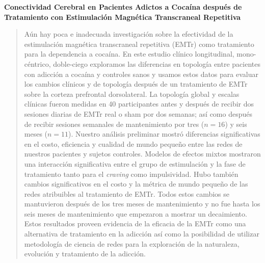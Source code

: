 \begin{center}
    \large\textbf{Conectividad Cerebral en Pacientes Adictos a Cocaína después de
     Tratamiento con Estimulación Magnética Transcraneal Repetitiva}
\end{center}
\begin{quotation}
    \noindent
    Aún hay poca e inadecuada investigación sobre la efectividad de la estimulación magnética transcraneal repetitiva (EMTr) como tratamiento para la dependencia a cocaína. En este estudio clínico longitudinal, mono-céntrico, doble-ciego exploramos las diferencias en topología entre pacientes con adicción a cocaína y controles sanos y usamos estos datos para evaluar los cambios clínicos y de topología después de un tratamiento de EMTr sobre la corteza prefrontal dorsolateral. La topología global y escalas clínicas fueron medidas en 40 participantes antes y después de recibir dos sesiones diarias de EMTr real o sham por dos semanas; así como después de recibir sesiones semanales de mantenimiento por tres ($n=16$) y seis meses ($n=11$). Nuestro análisis preliminar mostró diferencias significativas en el costo, eficiencia y cualidad de mundo pequeño entre las redes de nuestros pacientes y sujetos controles. Modelos de efectos mixtos mostraron una interacción significativa entre el grupo de estimulación y la fase de tratamiento tanto para el \textit{craving} como impulsividad. Hubo también cambios significativos en el costo y la métrica de mundo pequeño de las redes atribuibles al tratamiento de EMTr. Todos estos cambios se mantuvieron después de los tres meses de mantenimiento y no fue hasta los seis meses de mantenimiento que empezaron a mostrar un decaimiento. Estos resultados proveen evidencia de la eficacia de la EMTr como una alternativa de tratamiento en la adicción así como la posibilidad de utilizar metodología de ciencia de redes para la exploración de la naturaleza, evolución y tratamiento de la adicción.
\end{quotation}
\clearpage
